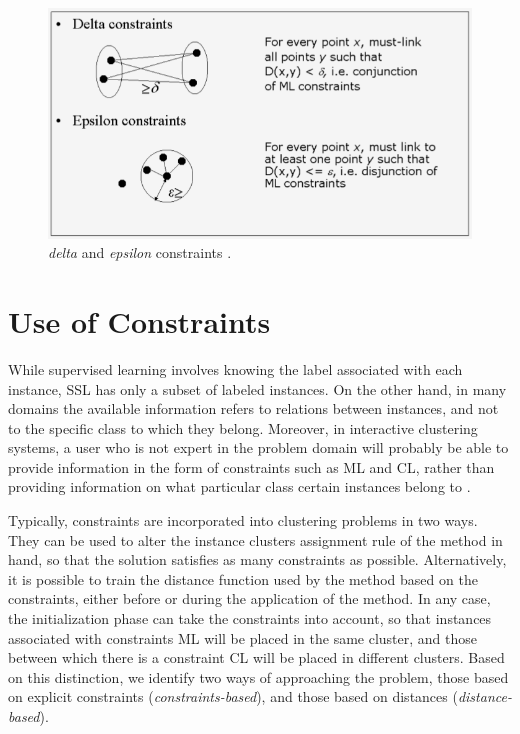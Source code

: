 \begin{figure}[!h]
	\centering
	\includegraphics[scale=0.45]{gfx/ConstClust/RestriccionesDeltaEpsilon.png} 
	\caption[\textit{delta} and \textit{epsilon} constraints]{\textit{delta} and \textit{epsilon} constraints \cite{davidson2007survey}.}\label{fig:DistanceConstraints}
\end{figure}


\section{Use of Constraints}

While supervised learning involves knowing the label associated with each instance, \acs{SSL} has only a subset of labeled instances. On the other hand, in many domains the available information refers to relations between instances, and not to the specific class to which they belong. Moreover, in interactive clustering systems, a user who is not expert in the problem domain will probably be able to provide information in the form of constraints such as \acs{ML} and \acs{CL}, rather than providing information on what particular class certain instances belong to \cite{cohn2003semi,davidson2007hierarchical}.

Typically, constraints are incorporated into clustering problems in two ways. They can be used to alter the instance clusters assignment rule of the method in hand, so that the solution satisfies as many constraints as possible. Alternatively, it is possible to train the distance function used by the method based on the constraints, either before or during the application of the method. In any case, the initialization phase can take the constraints into account, so that instances associated with constraints \acs{ML} will be placed in the same cluster, and those between which there is a constraint \acs{CL} will be placed in different clusters. Based on this distinction, we identify two ways of approaching the problem, those based on explicit constraints (\textit{constraints-based}), and those based on distances (\textit{distance-based}).

